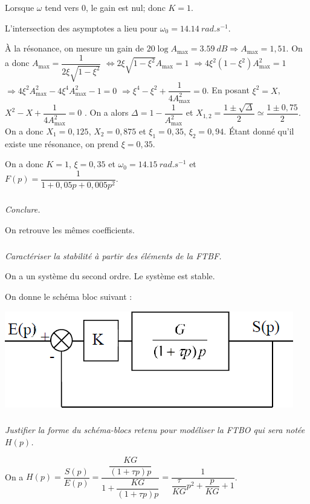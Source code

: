 \documentclass[10pt,fleqn]{article} %
\begin{document}
\begin{multicols}{2}
\begin{corrige}
Lorsque $\omega$ tend vers 0, le gain est nul; donc $K=1$.

L'intersection des asymptotes a lieu pour $\omega_0=\SI{14,14}{rad.s^{-1}}$. 

À la résonance, on mesure un gain de $20\log A_{\text{max}}=\SI{3,59}{dB}\Rightarrow A_{\text{max}}=1,51$. On a donc 
$A_{\text{max}} = \dfrac{1}{2\xi\sqrt{1-\xi^2}}$
$\Leftrightarrow {2\xi\sqrt{1-\xi^2}}A_{\text{max}}=1$
$\Rightarrow 4\xi^2\left(1-\xi^2\right)A_{\text{max}}^2=1 $
$\Rightarrow 4\xi^2A_{\text{max}}^2 -4\xi^4 A_{\text{max}}^2-1=0 $
$\Rightarrow \xi^4 - \xi^2 +\dfrac{1}{4A_{\text{max}}^2}=0 $. En posant $\xi^2=X$,  
$ X^2 - X +\dfrac{1}{4A_{\text{max}}^2}=0 $
. On a alors $\Delta = 1-\dfrac{1}{A_{\text{max}}^2}$ et $X_{1,2}=\dfrac{1\pm \sqrt{\Delta}}{2}\simeq \dfrac{1\pm 0,75}{2}$. On a donc $X_1=0,125$, $X_2=0,875$ et $\xi_1=0,35$, $\xi_2=0,94$. Étant donné qu'il existe une résonance, on prend $\xi=0,35$.

 On a donc $K=1$, $\xi=0,35$ et $\omega_0=\SI{14,15}{rad.s^{-1}}$ et $F(p)=\dfrac{1}{1+0,05p+0,005p^2}$.

\end{corrige}
\else
\fi

\subparagraph{}\textit{Conclure.}
\ifprof
\begin{corrige}
On retrouve les mêmes coefficients. 
\end{corrige}
\else
\fi

\subparagraph{}\textit{Caractériser la stabilité à partir des éléments de la FTBF.}
\ifprof
\begin{corrige}
On a un système du second ordre. Le système est stable. 
\end{corrige}
\else
\fi
On donne le schéma bloc suivant :

\begin{center}
\includegraphics[width=\linewidth]{images/fig_02}
\end{center}

\subparagraph{}\textit{Justifier la forme du schéma-blocs retenu pour modéliser la FTBO qui sera notée $H(p)$.}
\ifprof
\begin{corrige}
On a $H(p)=\dfrac{S(p)}{E(p)}
=\dfrac{\dfrac{KG}{\left(1+\tau p\right)p}}{1+\dfrac{KG}{\left(1+\tau p\right)p}}
=\dfrac{1}{\dfrac{\tau}{KG} p^2+\dfrac{p}{KG}+1}$.


\end{corrige}
\end{multicols}
\end{document}
